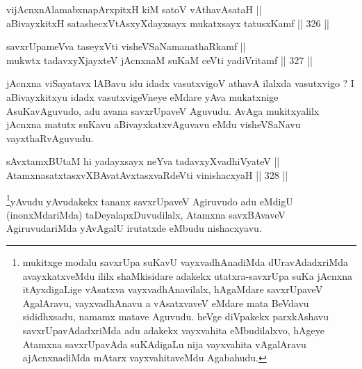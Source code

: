 \begin{shl}
\footnotemark[1]vijAcnxnAlamabxnapArxpitxH kiM satoV vA\s thavA\s sataH || \\
aBivayxkitxH satashecxVtAsxyXdayxsayx mukatxsayx tatusxKamf ||  326 ||  
\end{shl}

\begin{shl}
savxrUpameVva taseyxVti visheVSaNamanathaRkamf || \\
mukwtx tadavxyXjayxteV jAcnxnaM suKaM \footnotemark[3]ceVti yadiVritamf ||  327 ||  
\end{shl}

\begin{artha}
jAcnxna viSayatavx lABavu idu idadx vasutxvigoV athavA
ilalxda vasutxvigo ? I aBivayxkitxyu idadx vasutxvigeVneye eMdare yAva
mukatxnige AsuKavAguvudo, adu avana savxrUpaveV Aguvudu. AvAga
mukitxyalilx jAcnxna matutx suKavu aBivayxkatxvAguvavu eMdu
visheVSaNavu vayxthaRvAguvudu.
\end{artha}

\begin{shl}
sAvxtamxBUtaM hi yadayxsayx neYva tadavxyXvadhiVyateV || \\
AtamxnasatxtasxvXBAvatAvxtasxvaRdeVti vinishacxyaH ||  328 ||  
\end{shl}

\begin{artha}
\footnote{mukitxge modalu savxrUpa suKavU vayxvadhAnadiMda
dUravAdadxriMda avayxkatxveMdu ililx shaMkisidare adakekx
utatxra-savxrUpa suKa jAcnxna itAyxdigaLige vAsatxva
vayxvadhAnavilalx, hAgaMdare savxrUpaveV AgalAravu, vayxvadhAnavu a
vAsatxvaveV eMdare mata BeVdavu sididhxsadu, namamx matave Aguvudu. heVge diVpakekx parxkAshavu savxrUpavAdadxriMda adu adakekx vayxvahita eMbudilalxvo, hAgeye Atamxna savxrUpavAda suKAdigaLu nija vayxvahita vAgalAravu ajAcnxnadiMda mAtarx vayxvahitaveMdu Agabahudu.}yAvudu yAvudakekx tananx savxrUpaveV Agiruvudo adu eMdigU
(inonxMdariMda) taDeyalapxDuvudilalx, Atamxna savxBAvaveV
AgiruvudariMda yAvAgalU irutatxde eMbudu nishacxyavu.
\end{artha}


